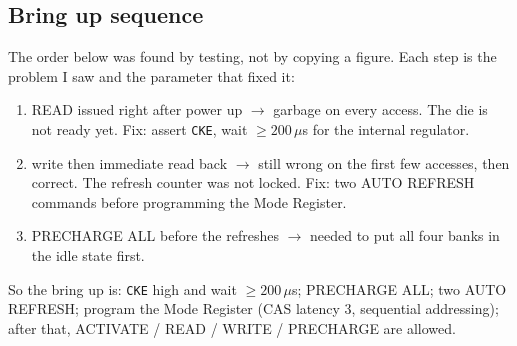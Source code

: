 \documentclass[a4paper,11pt]{article}
\begin{document}
\subsection{Bring up sequence}

The order below was found by testing, not by copying a figure. Each step is the
problem I saw and the parameter that fixed it:

\begin{enumerate}
\item READ issued right after power up $\to$ garbage on every access. The die is not
      ready yet. Fix: assert \texttt{CKE}, wait $\ge 200\,\mu$s for the internal
      regulator.
\item write then immediate read back $\to$ still wrong on the first few accesses,
      then correct. The refresh counter was not locked. Fix: two AUTO REFRESH
      commands before programming the Mode Register.
\item PRECHARGE ALL before the refreshes $\to$ needed to put all four banks in the
      idle state first.
\end{enumerate}

So the bring up is: \texttt{CKE} high and wait $\ge 200\,\mu$s; PRECHARGE ALL; two
AUTO REFRESH; program the Mode Register (CAS latency 3, sequential addressing);
after that, ACTIVATE / READ / WRITE / PRECHARGE are allowed.
\end{document}

